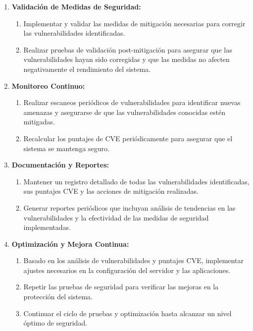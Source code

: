 \begin{enumerate}
    \item \textbf{Validación de Medidas de Seguridad:}
    \begin{enumerate}
        \item Implementar y validar las medidas de mitigación necesarias para corregir las vulnerabilidades identificadas.
        \item Realizar pruebas de validación post-mitigación para asegurar que las vulnerabilidades hayan sido corregidas y que las medidas no afecten negativamente el rendimiento del sistema.
    \end{enumerate}

    \item \textbf{Monitoreo Continuo:}
    \begin{enumerate}
        \item Realizar escaneos periódicos de vulnerabilidades para identificar nuevas amenazas y asegurarse de que las vulnerabilidades conocidas estén mitigadas.
        \item Recalcular los puntajes de CVE periódicamente para asegurar que el sistema se mantenga seguro.
    \end{enumerate}

    \item \textbf{Documentación y Reportes:}
    \begin{enumerate}
        \item Mantener un registro detallado de todas las vulnerabilidades identificadas, sus puntajes CVE y las acciones de mitigación realizadas.
        \item Generar reportes periódicos que incluyan análisis de tendencias en las vulnerabilidades y la efectividad de las medidas de seguridad implementadas.
    \end{enumerate}

    \item \textbf{Optimización y Mejora Continua:}
    \begin{enumerate}
        \item Basado en los análisis de vulnerabilidades y puntajes CVE, implementar ajustes necesarios en la configuración del servidor y las aplicaciones.
        \item Repetir las pruebas de seguridad para verificar las mejoras en la protección del sistema.
        \item Continuar el ciclo de pruebas y optimización hasta alcanzar un nivel óptimo de seguridad.
    \end{enumerate}
\end{enumerate}

